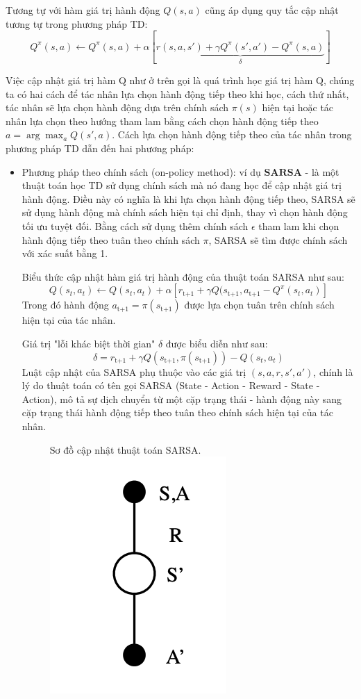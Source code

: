 \documentclass{uetgraduation}
\begin{document}
Tương tự với hàm giá trị hành động $Q(s, a)$ cũng áp dụng quy tắc cập nhật tương tự trong phương pháp TD:
\[
Q^\pi (s, a) \leftarrow Q^\pi (s, a) + \alpha [\underbrace{r(s, a, s') + \gamma Q^\pi (s', a') - Q^\pi (s, a)}_\delta]
\]

Việc cập nhật giá trị hàm Q như ở trên gọi là quá trình học giá trị hàm Q, chúng ta có hai cách để tác nhân lựa chọn hành động tiếp theo khi học, cách thứ nhất, tác nhân sẽ lựa chọn
hành động dựa trên chính sách $\pi (s)$ hiện tại hoặc tác nhân lựa chọn theo hướng tham lam bằng cách chọn hành động tiếp theo $a = \arg \max_{a} Q(s', a)$. Cách lựa chọn hành động
tiếp theo của tác nhân trong phương pháp TD dẫn đến hai phương pháp:
\begin{itemize}
    \item Phương pháp theo chính sách (on-policy method): ví dụ $\textbf{SARSA}$ - là một thuật toán học TD sử dụng chính sách mà nó đang học để cập nhật giá trị hành động. Điều này có nghĩa là
    khi lựa chọn hành động tiếp theo, SARSA sẽ sử dụng hành động mà chính sách hiện tại chỉ định, thay vì chọn hành động tối ưu tuyệt đối. Bằng cách sử dụng thêm chính sách $\epsilon$
    tham lam khi chọn hành động tiếp theo tuân theo chính sách $\pi$, SARSA sẽ tìm được chính sách với xác suất bằng 1.
    
    Biểu thức cập nhật hàm giá trị hành động của thuật toán SARSA như sau:
    \[
    Q(s_t, a_t) \leftarrow Q(s_t, a_t) + \alpha [r_\text{t+1} + \gamma Q (s_\text{t+1}, a_\text{t+1} - Q^\pi(s_t, a_t)]
    \]
    Trong đó hành động $a_\text{t+1} = \pi(s_\text{t+1})$ được lựa chọn tuân trên chính sách hiện tại của tác nhân.

    Giá trị "lỗi khác biệt thời gian" $\delta$ được biểu diễn như sau:
    \[
    \delta = r_\text{t+1} + \gamma Q (s_\text{t+1}, \pi(s_\text{t+1})) - Q (s_t, a_t)
    \]
    Luật cập nhật của SARSA phụ thuộc vào các giá trị $(s, a, r, s', a')$, chính là lý do thuật toán có tên gọi SARSA (State - Action - Reward - State - Action),
    mô tả sự dịch chuyển từ một cặp trạng thái - hành động này sang cặp trạng thái hành động tiếp theo tuân theo chính sách hiện tại của tác nhân.
    \begin{figure}{Sơ đồ cập nhật thuật toán SARSA.}
        \centering
        \includegraphics[scale=0.5]{sarsa_diagram}
        \label{fig:sarsa}
    \end{figure}


\end{itemize}
\end{document}
